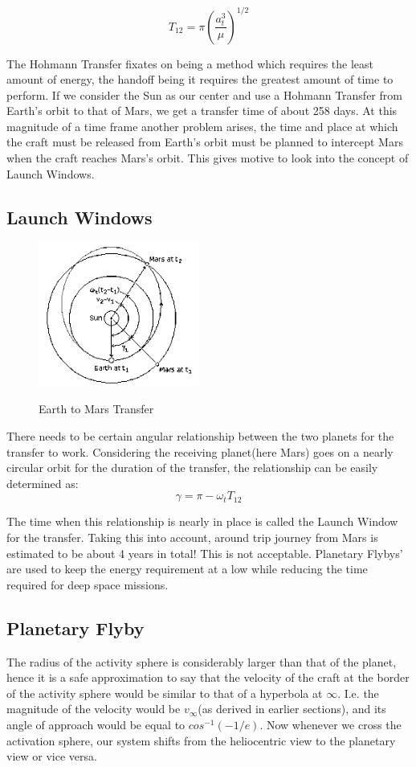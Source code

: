 \documentclass[12pt, letterpaper]{article}
\begin{document}
\[
	T_{12} = \pi \left(\frac{a_t^3}{\mu}\right)^{1/2}
\]

The Hohmann Transfer fixates on being a method which requires the least amount of energy, the handoff being it requires the greatest amount of time to perform. If we consider the Sun as our center and use a Hohmann Transfer from Earth's orbit to that of Mars, we get a transfer time of about 258 days. At this magnitude of a time frame another problem arises, the time and place at which the craft must be released from Earth's orbit must be planned to intercept Mars when the craft reaches Mars's orbit. This gives motive to look into the concept of Launch Windows.

\subsection{Launch Windows}
\begin{figure}[h!]
	\centering
    \includegraphics[width = 200px]{Mars}
    \label{fig:Mars}
    \caption{Earth to Mars Transfer}
\end{figure}

There needs to be certain angular relationship between the two planets for the transfer to work. Considering the receiving planet(here Mars) goes on a nearly circular orbit for the duration of the transfer, the relationship can be easily determined as:
\[
	\gamma = \pi - \omega_{t} T_{12}
\]

The time when this relationship is nearly in place is called the Launch Window for the transfer. Taking this into account, around trip journey from Mars is estimated to be about 4 years in total! This is not acceptable. Planetary Flybys' are used to keep the energy requirement at a  low while reducing the time required for deep space missions.

\subsection{Planetary Flyby}

The radius of the activity sphere is considerably larger than that of the planet, hence it is a safe approximation to say that the velocity of the craft at the border of the activity sphere would be similar to that of a hyperbola at $\infty$. I.e. the magnitude of the velocity would be $v_{\infty}$(as derived in earlier sections), and its angle of approach would be equal to $cos^{-1}(-1/e)$. Now whenever we cross the activation sphere, our system shifts from the heliocentric view to the planetary view or vice versa. 
\end{document}
